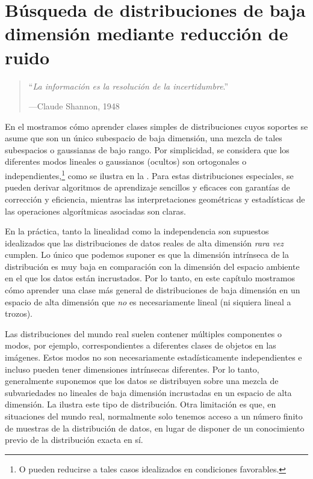 \documentclass[../../book-main.tex]{subfiles}
\begin{document}
\chapter{Búsqueda de distribuciones de baja dimensión mediante reducción de ruido}
\label{ch:denoising}

\begin{quote}
    \hfill ``\textit{La información es la resolución de la incertidumbre}.''

    \hfill ---Claude Shannon, 1948
\end{quote}
\vspace{5mm}

En el  mostramos cómo aprender clases simples de
distribuciones cuyos soportes se asume que son un único
subespacio de baja dimensión, una mezcla de tales subespacios o
gaussianas de bajo rango. Por simplicidad, se considera que los diferentes modos lineales o gaussianos (ocultos)
son ortogonales o independientes,\footnote{O pueden
reducirse a tales casos idealizados en condiciones favorables.} como
se ilustra en la . Para estas distribuciones especiales,
se pueden derivar algoritmos de aprendizaje sencillos y eficaces con garantías de corrección y eficiencia,
mientras las interpretaciones geométricas y estadísticas
de las operaciones algorítmicas asociadas son claras.

En la práctica, tanto la linealidad como la independencia son supuestos idealizados
que las distribuciones de datos reales de alta dimensión 
\textit{rara vez} cumplen. Lo único que podemos suponer es que la
dimensión intrínseca de la distribución es muy baja en comparación con la
dimensión del espacio ambiente en el que los datos están incrustados. Por lo tanto,
en este capítulo mostramos cómo aprender una clase más general de
distribuciones de baja dimensión en un espacio de alta dimensión que
\textit{no} es necesariamente lineal (ni siquiera lineal a trozos).

Las distribuciones del mundo real suelen contener múltiples componentes o
modos, por ejemplo, correspondientes a diferentes clases de objetos en
las imágenes. Estos modos no son necesariamente estadísticamente independientes e incluso pueden tener 
dimensiones intrínsecas diferentes. Por lo tanto, generalmente
suponemos que los datos se distribuyen sobre una mezcla de subvariedades no lineales 
de baja dimensión incrustadas en un espacio de alta dimensión. La 
 ilustra este tipo de distribución.  Otra
limitación es que, en situaciones del mundo real, normalmente solo tenemos acceso
a un número finito de muestras de la distribución de datos,
en lugar de disponer de un conocimiento previo de la distribución exacta en sí.
\end{document}
